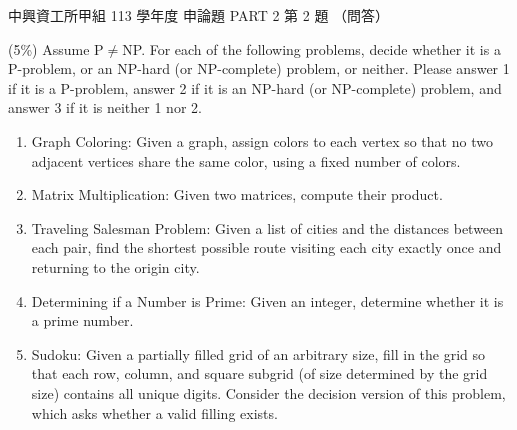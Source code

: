 \begin{pastexam}[label={px:nchu-113-dsa-26}]{中興資工所甲組 113 學年度 申論題 PART 2 第 2 題}
（問答）

(5\%) Assume P$\neq$NP. For each of the following problems, decide whether it is a P-problem, or an NP-hard
(or NP-complete) problem, or neither. Please answer 1 if it is a P-problem, answer 2 if it is an NP-hard (or
NP-complete) problem, and answer 3 if it is neither 1 nor 2.
\begin{enumerate}[label=(\arabic*)]
\item Graph Coloring: Given a graph, assign colors to each vertex so that no two adjacent vertices share the
same color, using a fixed number of colors.
\item Matrix Multiplication: Given two matrices, compute their product.
\item Traveling Salesman Problem: Given a list of cities and the distances between each pair, find the
shortest possible route visiting each city exactly once and returning to the origin city.
\item Determining if a Number is Prime: Given an integer, determine whether it is a prime number.
\item Sudoku: Given a partially filled grid of an arbitrary size, fill in the grid so that each row, column,
and square subgrid (of size determined by the grid size) contains all unique digits. Consider the decision
version of this problem, which asks whether a valid filling exists.
\end{enumerate}
\end{pastexam}

